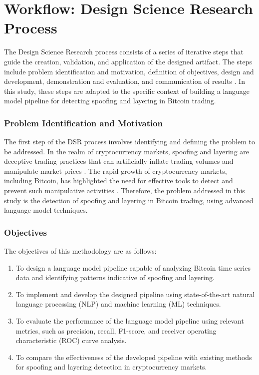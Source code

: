 \section{Workflow: Design Science Research Process}
The Design Science Research process consists of a series of iterative steps that guide the creation, validation, and
application of the designed artifact. The steps include problem identification and motivation, definition of objectives,
design and development, demonstration and evaluation, and communication of results \cite{hevner2010design,
peffers2007design}. In this study, these steps are adapted to the specific context of building a language model pipeline
for detecting spoofing and layering in Bitcoin trading.

\subsubsection{Problem Identification and Motivation}
The first step of the DSR process involves identifying and defining the problem to be addressed. In the realm of
cryptocurrency markets, spoofing and layering are deceptive trading practices that can artificially inflate trading
volumes and manipulate market prices \cite{gandal2018price, cartea2016algorithmic}. The rapid growth of cryptocurrency
markets, including Bitcoin, has highlighted the need for effective tools to detect and prevent such manipulative
activities \cite{chan2017statistical}. Therefore, the problem addressed in this study is the detection of spoofing and
layering in Bitcoin trading, using advanced language model techniques.

\subsubsection{Objectives}
The objectives of this methodology are as follows:

\begin{enumerate}
    \item To design a language model pipeline capable of analyzing Bitcoin time series data and identifying patterns
    indicative of spoofing and layering.
    \item To implement and develop the designed pipeline using state-of-the-art natural language processing (NLP) and
    machine learning (ML) techniques.
    \item To evaluate the performance of the language model pipeline using relevant metrics, such as precision, recall,
    F1-score, and receiver operating characteristic (ROC) curve analysis.
    \item To compare the effectiveness of the developed pipeline with existing methods for spoofing and layering
    detection in cryptocurrency markets.
\end{enumerate}

